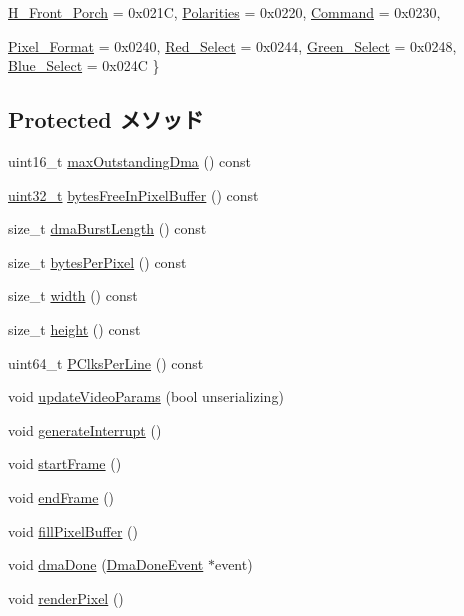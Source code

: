 \begin{DoxyCompactItemize}
\hyperlink{classHDLcd_a5589603d1462868f128ddcda455b167aa8139349b5f0b13a4b21053d61c043f13}{H\_\-Front\_\-Porch} =  0x021C, 
\hyperlink{classHDLcd_a5589603d1462868f128ddcda455b167aa080ddbafa8544f5e1f9838d62cea53b5}{Polarities} =  0x0220, 
\hyperlink{classHDLcd_a5589603d1462868f128ddcda455b167aafe3054aee03156c2553151700236dc9c}{Command} =  0x0230, 
\par
\hyperlink{classHDLcd_a5589603d1462868f128ddcda455b167aad92abc727f017e41476afd828019fd6f}{Pixel\_\-Format} =  0x0240, 
\hyperlink{classHDLcd_a5589603d1462868f128ddcda455b167aa3c14c44e84578139168434c48cff7ae4}{Red\_\-Select} =  0x0244, 
\hyperlink{classHDLcd_a5589603d1462868f128ddcda455b167aa35c8bdcdce89f753d2e287a46bd09528}{Green\_\-Select} =  0x0248, 
\hyperlink{classHDLcd_a5589603d1462868f128ddcda455b167aa7866c291b06c767b524c00d58fd7e0da}{Blue\_\-Select} =  0x024C
 \}
\end{DoxyCompactItemize}
\subsection*{Protected メソッド}
\begin{DoxyCompactItemize}
\item 
uint16\_\-t \hyperlink{classHDLcd_ac032891f1184bb5cfedef5c07217b0e9}{maxOutstandingDma} () const 
\item 
\hyperlink{Type_8hh_a435d1572bf3f880d55459d9805097f62}{uint32\_\-t} \hyperlink{classHDLcd_a83badcd3087541a2fd96f093739247cb}{bytesFreeInPixelBuffer} () const 
\item 
size\_\-t \hyperlink{classHDLcd_addfe179a028990a8ef8df5d347b5b7a9}{dmaBurstLength} () const 
\item 
size\_\-t \hyperlink{classHDLcd_aceeb8e7b68e5186d2459b6ec91a71169}{bytesPerPixel} () const 
\item 
size\_\-t \hyperlink{classHDLcd_a20646dd69e82674924c6e5eb1458eefa}{width} () const 
\item 
size\_\-t \hyperlink{classHDLcd_ac0e3c6ba1d3f8a8e50aa3e3897210a2b}{height} () const 
\item 
uint64\_\-t \hyperlink{classHDLcd_a7b7fa24d6d051f77c5554b18b422f016}{PClksPerLine} () const 
\item 
void \hyperlink{classHDLcd_a0eb6ee93145ff20e40a51ae7b8e4debf}{updateVideoParams} (bool unserializing)
\item 
void \hyperlink{classHDLcd_ab251ef5c4d9e1f0239542a9d8aa0dc3e}{generateInterrupt} ()
\item 
void \hyperlink{classHDLcd_a24932aa8063bd34ee82a44b55990fc56}{startFrame} ()
\item 
void \hyperlink{classHDLcd_a275cb0fc5850b339346d533d2e65aaa8}{endFrame} ()
\item 
void \hyperlink{classHDLcd_a8b6bacaad93cdca1a4f0697be74311c1}{fillPixelBuffer} ()
\item 
void \hyperlink{classHDLcd_aa86bef1e89693640a33feac9f6871f35}{dmaDone} (\hyperlink{classHDLcd_1_1DmaDoneEvent}{DmaDoneEvent} $\ast$event)
\item 
void \hyperlink{classHDLcd_a0a49e224296b89d614be23179d98d6a3}{renderPixel} ()
\end{DoxyCompactItemize}
